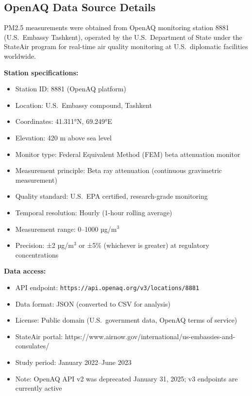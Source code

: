 \documentclass[11pt,a4paper]{article}
\begin{document}
\subsection{OpenAQ Data Source Details}

PM2.5 measurements were obtained from OpenAQ monitoring station 8881 (U.S.\ Embassy Tashkent), operated by the U.S.\ Department of State under the StateAir program for real-time air quality monitoring at U.S.\ diplomatic facilities worldwide.

\textbf{Station specifications:}
\begin{itemize}
    \item Station ID: 8881 (OpenAQ platform)
    \item Location: U.S.\ Embassy compound, Tashkent
    \item Coordinates: 41.311°N, 69.249°E
    \item Elevation: 420 m above sea level
    \item Monitor type: Federal Equivalent Method (FEM) beta attenuation monitor
    \item Measurement principle: Beta ray attenuation (continuous gravimetric measurement)
    \item Quality standard: U.S.\ EPA certified, research-grade monitoring
    \item Temporal resolution: Hourly (1-hour rolling average)
    \item Measurement range: 0--1000 µg/m$^3$
    \item Precision: ±2 µg/m$^3$ or ±5\% (whichever is greater) at regulatory concentrations
\end{itemize}

\textbf{Data access:}
\begin{itemize}
    \item API endpoint: \texttt{https://api.openaq.org/v3/locations/8881}
    \item Data format: JSON (converted to CSV for analysis)
    \item License: Public domain (U.S.\ government data, OpenAQ terms of service)
    \item StateAir portal: https://www.airnow.gov/international/us-embassies-and-consulates/
    \item Study period: January 2022--June 2023
    \item Note: OpenAQ API v2 was deprecated January 31, 2025; v3 endpoints are currently active
\end{itemize}
\end{document}
